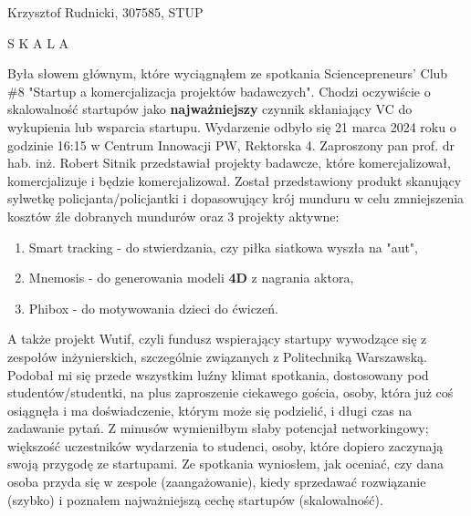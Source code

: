 \documentclass[12pt]{extreport}
\begin{document}
\begin{center} 
    Krzysztof Rudnicki, 307585, STUP
\end{center}
\begin{center}
    \Huge S K A L A
\end{center}
Była słowem głównym, które wyciągnąłem ze spotkania Sciencepreneurs' Club 
\#8 "Startup a komercjalizacja projektów badawczych". 
Chodzi oczywiście o skalowalność startupów jako \textbf{najważniejszy}
czynnik skłaniający VC do wykupienia lub wsparcia startupu. 
Wydarzenie odbyło się 21 marca 2024 roku o godzinie 16:15 w Centrum Innowacji PW, 
Rektorska 4. Zaproszony pan prof. dr hab. inż. Robert Sitnik 
przedstawiał projekty badawcze, które komercjalizował, 
komercjalizuje i będzie komercjalizował. 
Został przedstawiony produkt skanujący sylwetkę policjanta/policjantki i 
dopasowujący krój munduru w celu zmniejszenia kosztów źle dobranych mundurów 
oraz 3 projekty aktywne:
\begin{enumerate}
\item Smart tracking - do stwierdzania, czy piłka siatkowa wyszła na "aut",
\item Mnemosis - do generowania modeli \textbf{4D} z nagrania aktora,
\item Phibox - do motywowania dzieci do ćwiczeń.
\end{enumerate}

A także projekt Wutif, czyli fundusz wspierający startupy wywodzące się z 
zespołów inżynierskich, szczególnie związanych z Politechniką Warszawską. 
Podobał mi się przede wszystkim luźny klimat spotkania, 
dostosowany pod studentów/studentki, na plus zaproszenie ciekawego gościa, 
osoby, która już coś osiągnęła i ma doświadczenie, którym może się podzielić, 
i długi czas na zadawanie pytań. Z minusów wymieniłbym słaby potencjał networkingowy; 
większość uczestników wydarzenia to studenci, osoby, które dopiero zaczynają 
swoją przygodę ze startupami. Ze spotkania wyniosłem, jak oceniać, czy dana osoba 
przyda się w zespole (zaangażowanie), kiedy sprzedawać rozwiązanie (szybko) i 
poznałem najważniejszą cechę startupów (skalowalność).
\end{document}
